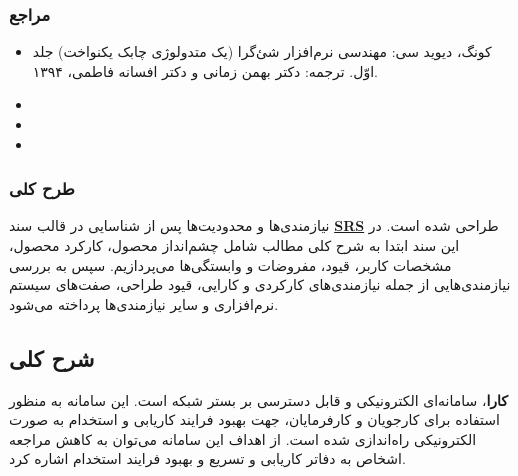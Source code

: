 \documentclass[12pt]{article}
\begin{document}
	\subsubsection{مراجع}
	\begin{itemize}
		\item
		کونگ، دیوید سی: مهندسی نرم‌افزار شئ‌گرا (یک متدولوژی چابک یکنواخت) جلد اوّل. ترجمه: دکتر بهمن زمانی و دکتر افسانه فاطمی، ۱۳۹۴.
		\item
		\item
		\item

	\end{itemize}

	\subsubsection{طرح کلی}
	نیازمندی‌ها و محدودیت‌ها پس از شناسایی در قالب سند
	\textbf{\hyperref[ref:srs]{SRS}}
	طراحی شده است. در این سند ابتدا به شرح کلی مطالب شامل چشم‌انداز محصول، کارکرد محصول، مشخصات کاربر، قیود، مفروضات و وابستگی‌ها می‌پردازیم. سپس به بررسی نیازمندی‌هایی از جمله نیازمندی‌های کارکردی و کارایی، قیود طراحی، صفت‌های سیستم نرم‌افزاری و سایر نیازمندی‌ها پرداخته می‌شود.

	\newpage
	\subsection{شرح کلی}
	\textbf{کارا}، سامانه‌ای الکترونیکی و قابل دسترسی بر بستر شبکه است. این سامانه به منظور استفاده برای کارجویان و کارفرمایان، جهت بهبود فرایند کاریابی و استخدام به صورت الکترونیکی راه‌اندازی شده است. از اهداف این سامانه می‌توان به کاهش مراجعه اشخاص به دفاتر کاریابی و تسریع و بهبود فرایند استخدام اشاره کرد.
\end{document}
